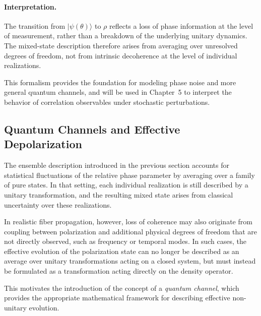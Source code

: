 \documentclass[a4paper]{article}
\begin{document}
\medskip

\paragraph{Interpretation.}

The transition from \( |\psi(\theta)\rangle \) to \( \rho \) reflects a loss of phase information at the level of measurement, rather than a breakdown of the underlying unitary dynamics. The mixed-state description therefore arises from averaging over unresolved degrees of freedom, not from intrinsic decoherence at the level of individual realizations.

\medskip

This formalism provides the foundation for modeling phase noise and more general quantum channels, and will be used in Chapter~5 to interpret the behavior of correlation observables under stochastic perturbations.


\subsection{Quantum Channels and Effective Depolarization}

The ensemble description introduced in the previous section accounts for statistical fluctuations of the relative phase parameter by averaging over a family of pure states. In that setting, each individual realization is still described by a unitary transformation, and the resulting mixed state arises from classical uncertainty over these realizations.

\medskip

In realistic fiber propagation, however, loss of coherence may also originate from coupling between polarization and additional physical degrees of freedom that are not directly observed, such as frequency or temporal modes. In such cases, the effective evolution of the polarization state can no longer be described as an average over unitary transformations acting on a closed system, but must instead be formulated as a transformation acting directly on the density operator.

\medskip

This motivates the introduction of the concept of a \emph{quantum channel}, which provides the appropriate mathematical framework for describing effective non-unitary evolution.
\end{document}
